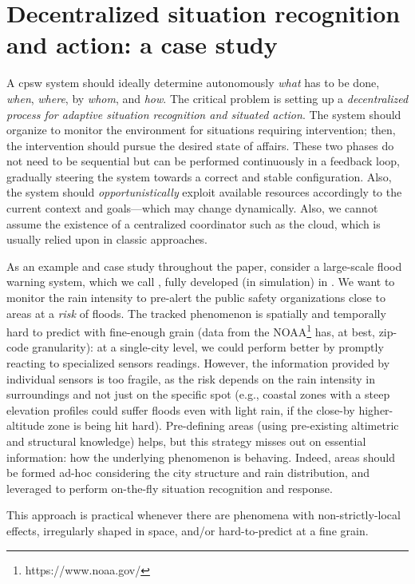 \section{Decentralized situation recognition and action: a case study}
\label{decentralized-sr}
A \ac{cpsw} system
 should ideally determine autonomously
 \emph{what} has to be done,
 \emph{when},
 \emph{where},
 by \emph{whom},
 and \emph{how}.
%
The critical problem is setting up 
a \emph{decentralized process
for adaptive situation recognition
and situated action}.
%
The system 
 should organize to
 monitor the environment
 for situations
 requiring intervention;
 then, 
 the intervention should
 pursue
 the desired state of affairs.
%
These two phases do not need to be sequential but can be performed continuously in a feedback loop, gradually steering the system towards a correct and stable configuration.
%
Also, the system should \emph{opportunistically} 
  exploit available resources
  accordingly to the current context and goals---which may change dynamically.
%
Also,
we cannot assume the existence of a centralized coordinator
 such as the cloud,
which is usually relied upon in classic approaches.
 
As an example and case study throughout the paper,
consider a large-scale flood warning system,
which we call \casename{},
fully developed (in simulation) in .
%
We want to monitor the rain intensity to pre-alert the public safety organizations close to areas at a \emph{risk} of floods.
%
The tracked phenomenon is spatially and temporally hard to predict with fine-enough grain
(data from the NOAA\footnote{https://www.noaa.gov/} has, at best, zip-code granularity):
at a single-city level,
we could perform better by promptly reacting to specialized sensors readings.
%
However, the information provided by individual sensors is too fragile,
as the risk depends on the rain intensity in surroundings and not just on the specific spot
(e.g., coastal zones with a steep elevation profiles could suffer floods even with light rain,
if the close-by higher-altitude zone is being hit hard).
%
Pre-defining areas
(using pre-existing altimetric and structural knowledge)
helps, but this strategy misses out on essential information:
how the underlying phenomenon is behaving.
%
Indeed, areas should be formed ad-hoc considering the city structure and rain distribution,
and leveraged to perform on-the-fly situation recognition and response.

This approach is practical whenever there are phenomena with non-strictly-local effects,
irregularly shaped in space,
and/or hard-to-predict at a fine grain.

